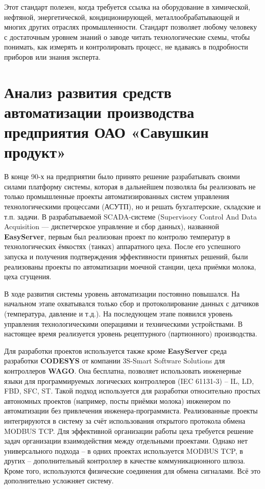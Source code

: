 Этот стандарт полезен, когда требуется ссылка на оборудование в химической, нефтяной, энергетической, кондиционирующей, металлообрабатывающей и многих других отраслях промышленности. Стандарт позволяет любому человеку с достаточным уровнем знаний о заводе читать технологические схемы, чтобы понимать, как измерять и контролировать процесс, не вдаваясь в подробности приборов или знания эксперта.

\section{Анализ развития средств автоматизации производства предприятия ОАО
«Савушкин продукт»}

В конце 90-х на предприятии было принято решение разрабатывать своими силами
платформу системы, которая в дальнейшем позволяла бы реализовать не только
промышленные проекты автоматизированных систем управления технологическими
процессами (АСУТП), но и решать бухгалтерские, складские и т.п. задачи. В
разрабатываемой SCADA-системе (Supervisory Control And Data Acquisition —
диспетчерское управление и сбор данных), названной \textbf{EasyServer}, первым
был реализован проект по контролю температур в технологических ёмкостях (танках)
аппаратного цеха. После его успешного запуска и получения подтверждения
эффективности принятых решений, были реализованы проекты по автоматизации
моечной станции, цеха приёмки молока, цеха сгущения.

В ходе развития системы уровень автоматизации постоянно повышался. На начальном
этапе охватывался только сбор и протоколирование данных с датчиков (температура,
давление и т.д.). На последующем этапе появился уровень управления
технологическими операциями и техническими устройствами. В настоящее время
реализуется уровень рецептурного (партионного) производства.

Для разработки проектов используется также кроме \textbf{EasyServer} среда
разработки \textbf{CODESYS} от компании 3S-Smart Software Solutions для
контроллеров \textbf{WAGO}. Она бесплатна, позволяет использовать инженерные
языки для программируемых логических контроллеров (IEC 61131-3) – IL, LD, FBD,
SFC, ST. Такой подход используется для разработки относительно простых
автономных проектов (например, посты приёмки молока) инженером по автоматизации
без привлечения инженера-программиста. Реализованные проекты интегрируются в
систему за счёт использования открытого протокола обмена MODBUS TCP. Для
эффективной организации работы цеха требуется решение задач организации
взаимодействия между отдельными проектами. Однако нет универсального подхода – в
одних проектах используется MODBUS TCP, в других – дополнительный контроллер в
качестве коммуникационного шлюза. Кроме того, используются физические соединения
для обмена сигналами. Всё это дополнительно усложняет систему.

